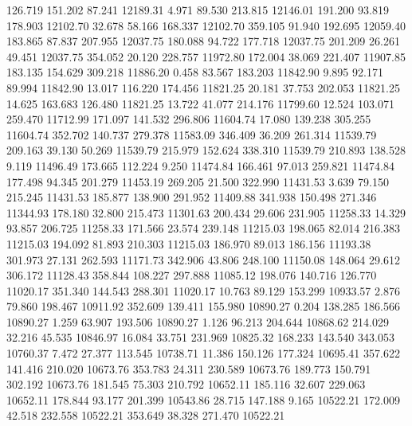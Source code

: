  126.719  151.202   87.241     12189.31
   4.971   89.530  213.815     12146.01
 191.200   93.819  178.903     12102.70
  32.678   58.166  168.337     12102.70
 359.105   91.940  192.695     12059.40
 183.865   87.837  207.955     12037.75
 180.088   94.722  177.718     12037.75
 201.209   26.261   49.451     12037.75
 354.052   20.120  228.757     11972.80
 172.004   38.069  221.407     11907.85
 183.135  154.629  309.218     11886.20
   0.458   83.567  183.203     11842.90
   9.895   92.171   89.994     11842.90
  13.017  116.220  174.456     11821.25
  20.181   37.753  202.053     11821.25
  14.625  163.683  126.480     11821.25
  13.722   41.077  214.176     11799.60
  12.524  103.071  259.470     11712.99
 171.097  141.532  296.806     11604.74
  17.080  139.238  305.255     11604.74
 352.702  140.737  279.378     11583.09
 346.409   36.209  261.314     11539.79
 209.163   39.130   50.269     11539.79
 215.979  152.624  338.310     11539.79
 210.893  138.528    9.119     11496.49
 173.665  112.224    9.250     11474.84
 166.461   97.013  259.821     11474.84
 177.498   94.345  201.279     11453.19
 269.205   21.500  322.990     11431.53
   3.639   79.150  215.245     11431.53
 185.877  138.900  291.952     11409.88
 341.938  150.498  271.346     11344.93
 178.180   32.800  215.473     11301.63
 200.434   29.606  231.905     11258.33
  14.329   93.857  206.725     11258.33
 171.566   23.574  239.148     11215.03
 198.065   82.014  216.383     11215.03
 194.092   81.893  210.303     11215.03
 186.970   89.013  186.156     11193.38
 301.973   27.131  262.593     11171.73
 342.906   43.806  248.100     11150.08
 148.064   29.612  306.172     11128.43
 358.844  108.227  297.888     11085.12
 198.076  140.716  126.770     11020.17
 351.340  144.543  288.301     11020.17
  10.763   89.129  153.299     10933.57
   2.876   79.860  198.467     10911.92
 352.609  139.411  155.980     10890.27
   0.204  138.285  186.566     10890.27
   1.259   63.907  193.506     10890.27
   1.126   96.213  204.644     10868.62
 214.029   32.216   45.535     10846.97
  16.084   33.751  231.969     10825.32
 168.233  143.540  343.053     10760.37
   7.472   27.377  113.545     10738.71
  11.386  150.126  177.324     10695.41
 357.622  141.416  210.020     10673.76
 353.783   24.311  230.589     10673.76
 189.773  150.791  302.192     10673.76
 181.545   75.303  210.792     10652.11
 185.116   32.607  229.063     10652.11
 178.844   93.177  201.399     10543.86
  28.715  147.188    9.165     10522.21
 172.009   42.518  232.558     10522.21
 353.649   38.328  271.470     10522.21
